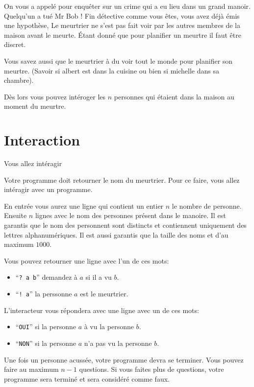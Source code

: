 \problemname{\problemyamlname}


\newcommand{\maxn}{10e5}  %

On vous a appelé pour enquêter sur un crime qui a eu lieu dans un grand manoir. Quelqu'un a tué Mr Bob ! Fin détective comme vous êtes, vous avez déjà émis une hypothèse,
Le meurtrier ne s'est pas fait voir par les autres membres de la maison avant le meurte. Étant donné que pour planifier un meurtre il faut être discret.

Vous savez aussi que le meurtrier à du voir tout le monde pour planifier son meurtre. (Savoir si albert est dans la cuisine ou bien si michelle dans sa chambre).

Dès lors vous pouvez intéroger les $n$ personnes qui étaient dans la maison au moment du meurtre. 


\section*{Interaction}
Vous allez intéragir 

Votre programme doit retourner le nom du meurtrier. Pour ce faire, vous allez intéragir avec un programme.

En entrée vous aurez une ligne qui contient un entier $n$ le nombre de personne.
Ensuite $n$ lignes avec le nom des personnes présent dans le manoire. Il est garantis que le nom des personnent sont distincts et contiennent uniquement des lettres alphanumériques.
Il est aussi garantis que la taille des noms et d'au maximum $1000$.

Vous pouvez retourner une ligne avec l'un de ces mots:

\begin{itemize}
    \item ``\texttt{? a b}'' demandez à $a$ si il a vu $b$.
    \item ``\texttt{! a}'' la perssonne $a$ est le meurtrier.
\end{itemize}

L'interacteur vous répondera avec une ligne avec un de ces mots:
\begin{itemize}
    \item ``\texttt{OUI}'' si la personne $a$ à vu la personne $b$.
    \item ``\texttt{NON}'' si la personne $a$ n'a pas vu la personne $b$.
\end{itemize}

Une fois un personne acussée, votre programme devra se terminer.
Vous pouvez faire au maximum $n - 1$ questions. Si vous faites plus de questions, votre programme sera terminé et sera considéré comme faux. 
